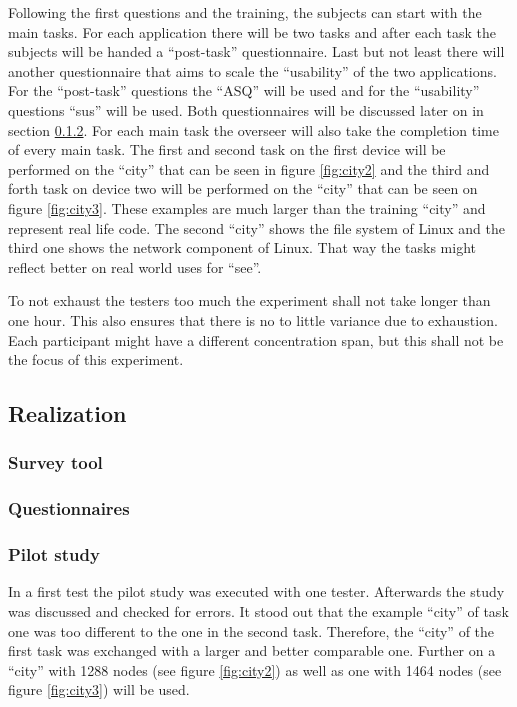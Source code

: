 Following the first questions and the training, the subjects can start with the main tasks.
For each application there will be two tasks and after each task the subjects will be handed a \enquote{\gls{post-task}} questionnaire.
Last but not least there will another questionnaire that aims to scale the \enquote{\gls{usability}} of the two applications.
For the \enquote{\gls{post-task}} questions the \enquote{\gls{ASQ}} will be used and for the \enquote{\gls{usability}} questions \enquote{\gls{sus}} will be used.
Both questionnaires will be discussed later on in section \ref{questionaires}.
For each main task the overseer will also take the completion time of every main task.
The first and second task on the first device will be performed on the \enquote{\gls{city}} that can be seen in figure \ref{fig:city2} and the third and forth task on device two will be performed on the \enquote{\gls{city}} that can be seen on figure \ref{fig:city3}.
These examples are much larger than the training \enquote{\gls{city}} and represent real life code.
The second \enquote{\gls{city}} shows the file system of Linux and the third one shows the network component of Linux. 
That way the tasks might reflect better on real world uses for \enquote{\gls{see}}.

To not exhaust the testers too much the experiment shall not take longer than one hour. 
This also ensures that there is no to little variance due to exhaustion.
Each participant might have a different concentration span, but this shall not be the focus of this experiment. 

\subsection{Realization}
\label{real}
\subsubsection{Survey tool}
\subsubsection{Questionnaires}
\label{questionaires}
\subsubsection{Pilot study}
In a first test the pilot study was executed with one tester. 
Afterwards the study was discussed and checked for errors. 
It stood out that the example \enquote{\gls{city}} of task one was too different to the one in the second task.
Therefore, the \enquote{\gls{city}} of the first task was exchanged with a larger and better comparable one.
Further on a \enquote{\gls{city}} with 1288 nodes (see figure \ref{fig:city2}) as well as one with 1464 nodes (see figure \ref{fig:city3}) will be used.

